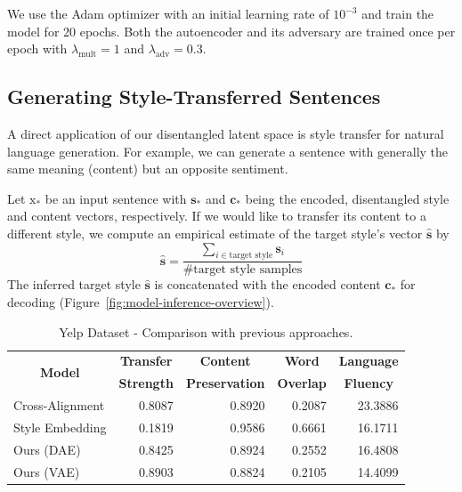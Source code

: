 \documentclass[11pt,a4paper]{article}
\newcommand{\rmx}{\mathrm x} %
\newcommand{\tabh}[1]{\multicolumn{1}{c|}{\textbf{#1}}}  %
\newcommand{\tabc}[2]{\multicolumn{1}{|c|}{\multirow{#1}{*}{\textbf{#2}}}} %
\begin{document}
We use the Adam optimizer \cite{kingma2014adam} with an initial learning rate of $10^{-3}$ and train the model for 20 epochs. Both the autoencoder and its adversary are trained once per epoch with $\lambda_\text{mult} = 1$ and $\lambda_\text{adv} = 0.3$.

\subsection{Generating Style-Transferred Sentences} \label{ss:prediction}

A direct application of our disentangled latent space is style transfer for natural language generation. For example, we can generate a sentence with generally the same meaning (content) but an opposite sentiment.

Let $\rmx_*$ be an input sentence with $\bm s_*$ and $\bm c_*$ being the encoded, disentangled style and content vectors, respectively. If we would like to transfer its content to a different style, we compute an empirical estimate of the target style's vector $\hat{\bm s}$ by
\begin{equation*}
	\hat{\bm s}=\frac{\sum_{i\in\text{target style}}\bm s_i}{\text{\# target style samples}}
\end{equation*}
The inferred target style $\hat{\bm s}$ is concatenated with the encoded content $\bm c_*$ for decoding (Figure~\ref{fig:model-inference-overview}).


\begin{table}[ht]
	\centering
	\begin{tabular}{| l | r | r | r | r |}
		\hline
		\tabc{2}{Model}                       & \tabh{Transfer} & \tabh{Content}      & \tabh{Word}    & \tabh{Language} \\
		                                      & \tabh{Strength} & \tabh{Preservation} & \tabh{Overlap} & \tabh{Fluency}  \\
		\hline
		\hline
		Cross-Alignment \citep{shen2017style} & 0.8087          & 0.8920              & 0.2087         & 23.3886         \\
		\hline
		Style Embedding \citep{fu2017style}   & 0.1819          & 0.9586              & 0.6661         & 16.1711         \\
		\hline
		Ours (DAE)                            & 0.8425          & 0.8924              & 0.2552         & 16.4808         \\
		\hline
		Ours (VAE)                            & 0.8903          & 0.8824              & 0.2105         & 14.4099         \\
		\hline
	\end{tabular}
	\caption{Yelp Dataset - Comparison with previous approaches.}
	\label{tab:yelp-comparison-previous}
\end{table}
\end{document}
